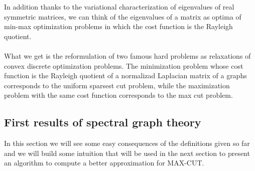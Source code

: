 In addition thanks to the variational characterization of eigenvalues of real symmetric matrices, we can think of the eigenvalues of a matrix as optima of min-max optimization problems in which the cost function is the Rayleigh quotient. \\ \\
What we get is the reformulation of two famous hard problems as relaxations of convex  discrete optimization problems.
The minimization problem whose cost function is the Rayleigh quotient of a normalizad Laplacian matrix of a graphs corresponds to the uniform sparsest cut problem, while the maximization problem with the same cost function corresponds to the max cut problem.  

\subsection{First results of spectral graph theory}
In this section we will see some easy consequences of the definitions given so far and we will build some intuition that will be used in the next section to present an algorithm to compute a better approximation for MAX-CUT.

